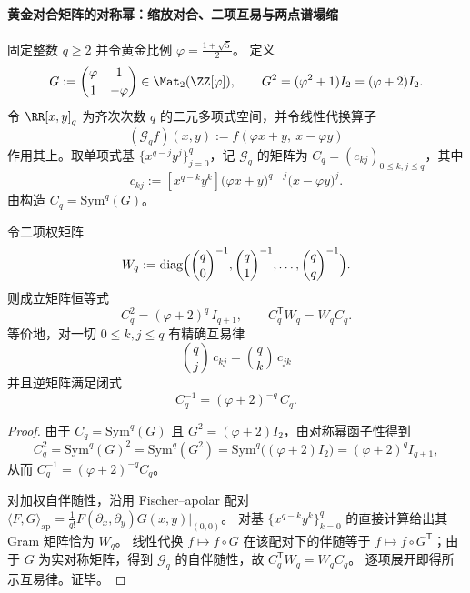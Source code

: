 \paragraph{黄金对合矩阵的对称幂：缩放对合、二项互易与两点谱塌缩}
固定整数 \(q\ge 2\) 并令黄金比例 \(\varphi=\frac{1+\sqrt5}{2}\)。
定义
\[
G:=\begin{pmatrix}\varphi&1\\[2pt]1&-\varphi\end{pmatrix}\in\Mat_2(\ZZ[\varphi]),
\qquad
G^2=(\varphi^2+1)I_2=(\varphi+2)I_2.
\]
令 \(\RR[x,y]_q\) 为齐次次数 \(q\) 的二元多项式空间，并令线性代换算子
\[
(\mathcal{G}_q f)(x,y):=f(\varphi x+y,\ x-\varphi y)
\]
作用其上。取单项式基 \(\{x^{q-j}y^j\}_{j=0}^{q}\)，记 \(\mathcal{G}_q\) 的矩阵为 \(C_q=(c_{k j})_{0\le k,j\le q}\)，其中
\[
c_{k j}:=[x^{q-k}y^k]\bigl(\varphi x+y\bigr)^{q-j}\bigl(x-\varphi y\bigr)^j.
\]
由构造 \(C_q=\mathrm{Sym}^q(G)\)。

\begin{conclusion}[缩放对合与二项互易：\texorpdfstring{$C_q^2=(\varphi+2)^qI$}{Cq^2=(phi+2)^q I}]\label{con:xi-symq-golden-involution-reciprocity}
令二项权矩阵
\[
W_q:=\mathrm{diag}\Bigl(\binom{q}{0}^{-1},\binom{q}{1}^{-1},\dots,\binom{q}{q}^{-1}\Bigr).
\]
则成立矩阵恒等式
\[
\boxed{\;
C_q^2=(\varphi+2)^{q}\,I_{q+1},
\qquad
C_q^{\mathsf T}W_q=W_qC_q.\;}
\]
等价地，对一切 \(0\le k,j\le q\) 有精确互易律
\[
\boxed{\;
\binom{q}{j}\,c_{k j}=\binom{q}{k}\,c_{j k}\;}
\]
并且逆矩阵满足闭式
\[
\boxed{\;
C_q^{-1}=(\varphi+2)^{-q}\,C_q.\;}
\]
\end{conclusion}
\begin{proof}
由于 \(C_q=\mathrm{Sym}^q(G)\) 且 \(G^2=(\varphi+2)I_2\)，由对称幂函子性得到
\[
C_q^2=\mathrm{Sym}^q(G)^2=\mathrm{Sym}^q(G^2)=\mathrm{Sym}^q\!\bigl((\varphi+2)I_2\bigr)=(\varphi+2)^q I_{q+1},
\]
从而 \(C_q^{-1}=(\varphi+2)^{-q}C_q\)。
\par
对加权自伴随性，沿用 Fischer--apolar 配对
\(
\langle F,G\rangle_{\mathrm{ap}}=\frac{1}{q!}F(\partial_x,\partial_y)G(x,y)\big|_{(0,0)}
\)。
对基 \(\{x^{q-k}y^k\}_{k=0}^{q}\) 的直接计算给出其 Gram 矩阵恰为 \(W_q\)。
线性代换 \(f\mapsto f\circ G\) 在该配对下的伴随等于 \(f\mapsto f\circ G^{\mathsf T}\)；由于 \(G\) 为实对称矩阵，得到 \(\mathcal{G}_q\) 的自伴随性，故 \(C_q^{\mathsf T}W_q=W_qC_q\)。
逐项展开即得所示互易律。证毕。
\end{proof}

